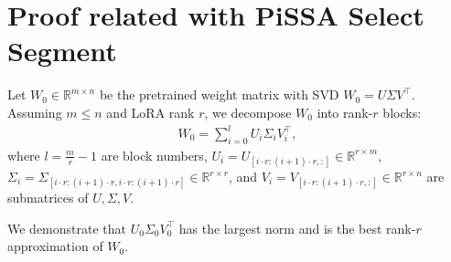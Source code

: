 \section{Proof related with PiSSA Select Segment} \label{app:pissa}

\begin{tcolorbox}[colback=gray!20,colframe=gray]
\begin{lemma}
Let \( W_0 \in \mathbb{R}^{m \times n} \) be the pretrained weight matrix with SVD \( W_0 = U \Sigma V^\top \). Assuming \( m \leq n \) and LoRA rank \( r \), we decompose \( W_0 \) into rank-\( r \) blocks:
\begin{align}
W_0 = \sum_{i=0}^{l} U_i \Sigma_i V_i^\top,
\end{align}
where \(l=\frac{m}{r} - 1\) are block numbers, \( U_i = U_{[i \cdot r : (i+1) \cdot r, :]} \in \mathbb{R}^{r \times m} \), \( \Sigma_i = \Sigma_{[i \cdot r : (i+1) \cdot r, i \cdot r : (i+1) \cdot r]} \in \mathbb{R}^{r \times r} \), and  \( V_i = V_{[i \cdot r : (i+1) \cdot r, :]} \in \mathbb{R}^{r \times n} \) are submatrices of \( U, \Sigma, V \).

We demonstrate that \( U_0 \Sigma_0 V_0^\top \) has the largest norm and is the best rank-\( r \) approximation of \( W_0 \).
\end{lemma}
\end{tcolorbox}

